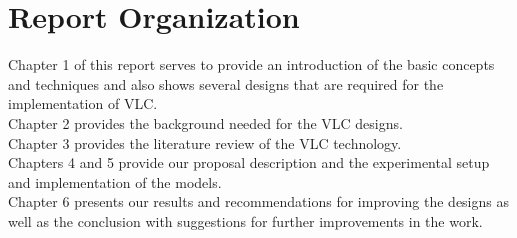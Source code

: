 
\section{Report Organization}

Chapter 1 of this report serves to provide an introduction of the basic concepts and techniques and also shows several designs that are required for the implementation of VLC.  \\
Chapter 2 provides the background needed for the VLC designs. \\ 
Chapter 3 provides the literature review of the VLC technology. \\ 
Chapters 4 and 5 provide our proposal description and the experimental setup and implementation of the models. \\
Chapter 6 presents our results and recommendations for improving the designs as well as the conclusion with suggestions for further improvements in the work.